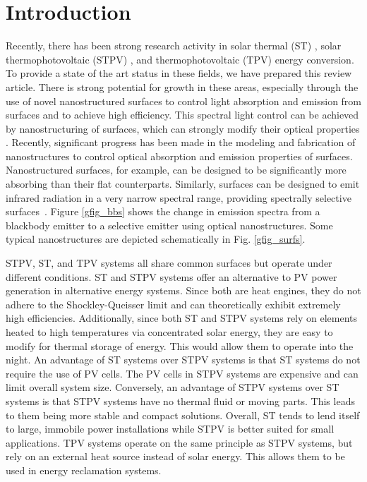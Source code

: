 \documentclass[10pt,letterpaper]{article}
\begin{document}
\section{Introduction}
Recently, there has been strong research activity in solar thermal (ST) \cite{g1,g2}, solar thermophotovoltaic (STPV) \cite{g3,g4,g5}, and thermophotovoltaic (TPV) \cite{g6,g7} energy conversion.  To provide a state of the art status in 
these fields, we have prepared this review article.  There is strong potential for growth in these areas, especially 
through the use of novel nanostructured surfaces to control light absorption and emission from surfaces and to 
achieve high efficiency. This spectral light control can be achieved by nanostructuring of surfaces, 
which can strongly modify their optical properties \cite{g8,g9,RF_OptExp_2009}. Recently, significant progress has been made in the modeling and fabrication of nanostructures to control optical absorption and emission properties of surfaces. 
Nanostructured surfaces, for example, can be designed to be significantly
more absorbing than their flat counterparts.
Similarly, surfaces can be designed to emit infrared radiation in a very narrow spectral range, providing spectrally selective 
surfaces~\cite{G_PS_1985, C_RPP_2014}.  Figure \ref{gfig_bbs} shows the change in 
emission spectra from a blackbody emitter to a selective emitter using optical nanostructures.
Some typical nanostructures are depicted schematically in Fig. \ref{gfig_surfs}.

STPV, ST, and TPV systems all share common surfaces but operate under different conditions.  ST and STPV systems offer an alternative to PV power generation in alternative energy systems.  Since both are heat engines, they do not adhere to the Shockley-Queisser limit and can theoretically exhibit extremely high efficiencies.  Additionally, since both ST and STPV systems rely on elements heated to high temperatures via concentrated solar energy, they are easy to modify for thermal storage of energy.  This would allow them to operate into the night.  An advantage of ST systems over STPV systems is that ST systems do not require the use of PV cells.  The PV cells in STPV systems are expensive and can limit overall system size.  Conversely, an advantage of STPV systems over ST systems is that STPV systems have no thermal fluid or moving parts.  This leads to them being more stable and compact solutions.  Overall, ST tends to lend itself to large, immobile power installations while STPV is better suited for small applications.  TPV systems operate on the same principle as STPV systems, but rely on an external heat source instead of solar energy.  This allows them to be used in energy reclamation systems.
\end{document}
